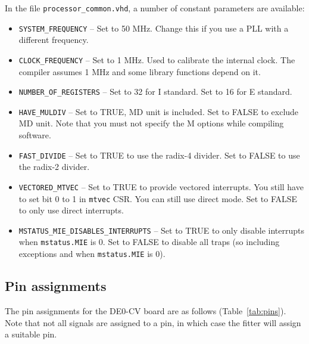 \documentclass[12pt]{article}
\begin{document}
In the file \lstinline|processor_common.vhd|, a number of constant parameters are available:
\begin{itemize}
\item \lstinline|SYSTEM_FREQUENCY| -- Set to 50 MHz. Change this if you use a PLL with a different frequency.
\item \lstinline|CLOCK_FREQUENCY| -- Set to 1 MHz. Used to calibrate the internal clock. The compiler assumes 1 MHz and some library functions depend on it.
\item \lstinline|NUMBER_OF_REGISTERS| -- Set to 32 for I standard. Set to 16 for E standard.
\item \lstinline|HAVE_MULDIV| -- Set to TRUE, MD unit is included. Set to FALSE to exclude MD unit. Note that you must not specify the M options while compiling software.
\item \lstinline|FAST_DIVIDE| -- Set to TRUE to use the radix-4 divider. Set to FALSE to use the radix-2 divider.
\item \lstinline|VECTORED_MTVEC| -- Set to TRUE to provide vectored interrupts. You still have to set bit 0 to 1 in \lstinline|mtvec| CSR. You can still use direct mode. Set to FALSE to only use direct interrupts.
\item \lstinline|MSTATUS_MIE_DISABLES_INTERRUPTS| -- Set to TRUE to only disable interrupts when \lstinline|mstatus.MIE| is 0. Set to FALSE to disable all traps (so including exceptions and when \lstinline|mstatus.MIE| is 0).
\end{itemize}

\subsection{Pin assignments}
The pin assignments for the DE0-CV board are as follows (Table~\ref{tab:pins}). Note that not all signals are assigned to a pin, in which case the fitter will assign a suitable pin.
\end{document}
